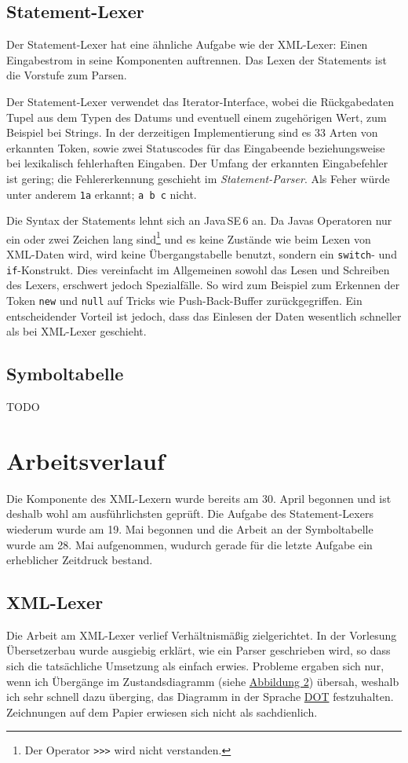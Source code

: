 \documentclass[10pt,a4paper,ngerman,titlepage,tocindentauto]{article}
\begin{document}
		\subsection{Statement-Lexer}
			Der Statement-Lexer hat eine ähnliche Aufgabe wie der XML-Lexer: Einen Eingabestrom in seine
			Komponenten auftrennen. Das Lexen der Statements ist die Vorstufe zum Parsen.
			
			Der Statement-Lexer verwendet das Iterator-Interface, wobei die Rückgabedaten
			Tupel aus dem Typen des Datums und eventuell einem zugehörigen Wert, zum Beispiel bei Strings.
			In der derzeitigen Implementierung sind es 33 Arten von erkannten Token, sowie zwei
			Statuscodes für das Eingabeende beziehungsweise bei lexikalisch fehlerhaften Eingaben.
			Der Umfang der erkannten Eingabefehler ist gering; die Fehlererkennung geschieht im
			{\em Statement-Parser}. Als Feher würde unter anderem \verb|1a| erkannt; \verb|a b c| nicht.
			
			Die Syntax der Statements lehnt sich an Java\,SE\,6 an. Da Javas Operatoren nur ein oder
			zwei Zeichen lang sind\footnote{Der Operator \texttt{{>}>{>}} wird nicht verstanden.} und es keine Zustände wie beim
			Lexen von XML-Daten wird, wird keine Übergangstabelle benutzt, sondern ein \verb|switch|- und
			\verb|if|-Konstrukt. Dies vereinfacht im Allgemeinen sowohl das Lesen und Schreiben des Lexers,
			erschwert jedoch Spezialfälle. So wird zum Beispiel zum Erkennen der Token \verb|new| und
			\verb|null| auf Tricks wie Push-Back-Buffer zurückgegriffen.
			Ein entscheidender Vorteil ist jedoch, dass das Einlesen der Daten wesentlich schneller
			als bei XML-Lexer geschieht.
	
		\subsection{Symboltabelle}
			TODO
	
	\section[Arbeitsverlauf]{\hypertarget{Arbeitsverlauf}{Arbeitsverlauf}}
		Die Komponente des XML-Lexern wurde bereits am 30. April begonnen und ist deshalb
		wohl am ausführlichsten geprüft. Die Aufgabe des Statement-Lexers wiederum wurde
		am 19. Mai begonnen und die Arbeit an der Symboltabelle wurde am 28. Mai aufgenommen,
		wudurch gerade für die letzte Aufgabe ein erheblicher Zeitdruck bestand.
	
		\subsection{XML-Lexer}
			Die Arbeit am XML-Lexer verlief Verhältnismäßig zielgerichtet. In der Vorlesung
			Übersetzerbau wurde ausgiebig erklärt, wie ein Parser geschrieben wird, so dass
			sich die tatsächliche Umsetzung als einfach erwies. Probleme ergaben sich nur,
			wenn ich Übergänge im Zustandsdiagramm (siehe \hyperlink{Uebergangsdiagramm_XML_Lexer}{Abbildung 2})
			übersah, weshalb ich sehr schnell dazu überging, das Diagramm in der Sprache
			\href{http://www.graphviz.org/doc/info/lang.html}{DOT} festzuhalten. Zeichnungen auf
			dem Papier erwiesen sich nicht als sachdienlich.
			
\end{document}
